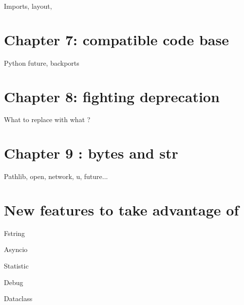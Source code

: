 \documentclass[paperwidth=8in, paperheight=10in,lang=en]{elegantbook}
\begin{document}
Imports, layout,

\chapter{Chapter 7: compatible code base}

Python future, backports

\chapter{Chapter 8: fighting deprecation}

What to replace with what ?

\chapter{Chapter 9 : bytes and str}

Pathlib, open, network, u, future...

\chapter{New features to take advantage of}\label{chap:new_features}


Fstring

Asyncio

Statistic

Debug

Dataclass

\appendix

\printglossaries

\backmatter %


\end{document}
